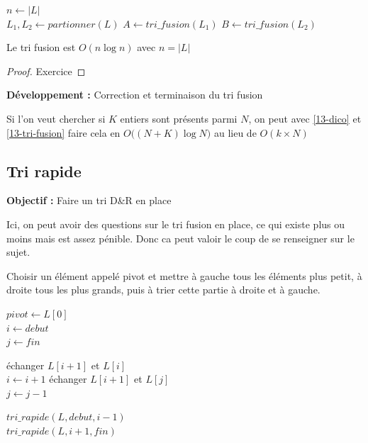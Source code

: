 \begin{algorithm}[H]
	\caption{$tri\_fusion(L)$}
	$n \gets |L|$\\
	$L_1, L_2 \gets partionner(L)$ 
	$A \gets tri\_fusion(L_1)$ 
	$B \gets tri\_fusion(L_2)$
\end{algorithm}

\begin{proposition}
	Le tri fusion est $O(n \log n)$ avec $n = |L|$
\end{proposition}

\begin{proof}
	Exercice
\end{proof}

\textbf{Développement :} Correction et terminaison du tri fusion

\begin{appl}
	Si l'on veut chercher si $K$ entiers sont présents parmi $N$, on peut avec \ref{13-dico} et \ref{13-tri-fusion} faire cela en $O\big((N + K) \log N \big)$ au lieu de $O(k\times N)$
\end{appl}



\subsection{Tri rapide}

\textbf{Objectif :} Faire un tri D\&R en place

\begin{com}
	Ici, on peut avoir des questions sur le tri fusion en place, ce qui existe plus ou moins mais est assez pénible. Donc ca peut valoir le coup de se renseigner sur le sujet.
\end{com}

\begin{idee}
	Choisir un élément appelé pivot et mettre à gauche tous les éléments plus petit, à droite tous les plus grands, puis à trier cette partie à droite et à gauche.
\end{idee}

\begin{algorithm}
	\caption{$tri\_rapide(L, debut, fin)$}
	{}	
	$pivot \gets L[0]$\\	
	$i \gets debut$\\
	$j \gets fin$\\
	{
		{
			échanger $L[i+1]$ et $L[i]$\\
			$i \gets i+1$
		}{		
			échanger $L[i+1]$ et $L[j]$\\
			$j \gets j - 1$
		}
		
		$tri\_rapide(L, debut, i-1)$\\	
		$tri\_rapide(L, i+1, fin)$\\
	}
\end{algorithm}

